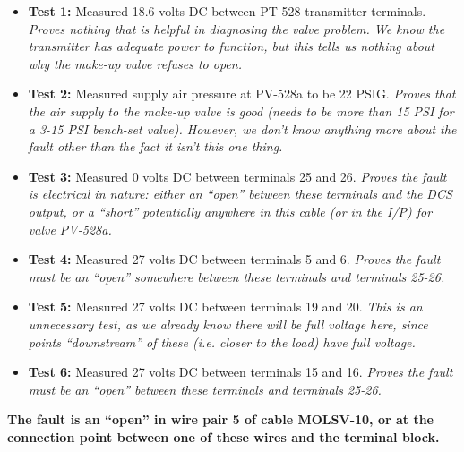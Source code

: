 \vfil 

\eject






\begin{itemize}
\item{} {\bf Test 1:} Measured 18.6 volts DC between PT-528 transmitter terminals.  {\it Proves nothing that is helpful in diagnosing the valve problem.  We know the transmitter has adequate power to function, but this tells us nothing about why the make-up valve refuses to open.}
\vskip 5pt
\item{} {\bf Test 2:} Measured supply air pressure at PV-528a to be 22 PSIG.  {\it Proves that the air supply to the make-up valve is good (needs to be more than 15 PSI for a 3-15 PSI bench-set valve).  However, we don't know anything more about the fault other than the fact it isn't this one thing.}
\vskip 5pt
\item{} {\bf Test 3:} Measured 0 volts DC between terminals 25 and 26.  {\it Proves the fault is electrical in nature: either an ``open'' between these terminals and the DCS output, or a ``short'' potentially anywhere in this cable (or in the I/P) for valve PV-528a.}
\vskip 5pt
\item{} {\bf Test 4:} Measured 27 volts DC between terminals 5 and 6. {\it Proves the fault must be an ``open'' somewhere between these terminals and terminals 25-26.}
\vskip 5pt
\item{} {\bf Test 5:} Measured 27 volts DC between terminals 19 and 20. {\it This is an unnecessary test, as we already know there will be full voltage here, since points ``downstream'' of these (i.e. closer to the load) have full voltage.}
\vskip 5pt
\item{} {\bf Test 6:} Measured 27 volts DC between terminals 15 and 16. {\it Proves the fault must be an ``open'' between these terminals and terminals 25-26.}
\vskip 5pt
\end{itemize}

\vskip 10pt

{\bf The fault is an ``open'' in wire pair 5 of cable MOLSV-10, or at the connection point between one of these wires and the terminal block.}











